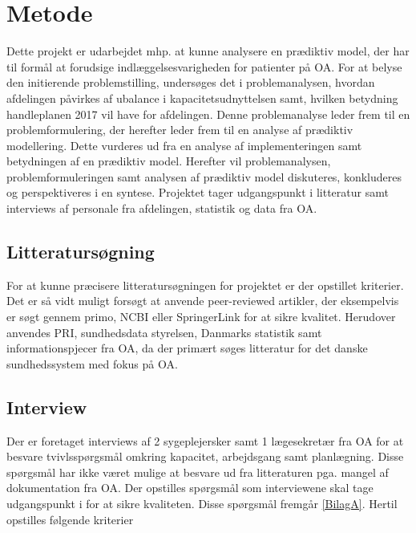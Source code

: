 

\section{Metode}
Dette projekt er udarbejdet mhp. at kunne analysere en prædiktiv model, der har til formål at forudsige indlæggelsesvarigheden for patienter på OA. For at belyse den initierende problemstilling, undersøges det i problemanalysen, hvordan afdelingen påvirkes af ubalance i kapacitetsudnyttelsen samt, hvilken betydning handleplanen 2017 vil have for afdelingen. Denne problemanalyse leder frem til en problemformulering, der herefter leder frem til en analyse af prædiktiv modellering. Dette vurderes ud fra en analyse af implementeringen samt betydningen af en prædiktiv model. Herefter vil problemanalysen, problemformuleringen samt analysen af prædiktiv model diskuteres, konkluderes og perspektiveres i en syntese. Projektet tager udgangspunkt i litteratur samt interviews af personale fra afdelingen, statistik og data fra OA. 


\subsection{Litteratursøgning}
For at kunne præcisere litteratursøgningen for projektet er der opstillet kriterier. Det er så vidt muligt forsøgt at anvende peer-reviewed artikler, der eksempelvis er søgt gennem primo, NCBI eller SpringerLink for at sikre kvalitet. Herudover anvendes PRI, sundhedsdata styrelsen, Danmarks statistik samt informationspjecer fra OA, da der primært søges litteratur for det danske sundhedssystem med fokus på OA. 


\subsection{Interview}
Der er foretaget interviews af 2 sygeplejersker samt 1 lægesekretær fra OA for at besvare tvivlsspørgsmål omkring kapacitet, arbejdsgang samt planlægning. Disse spørgsmål har ikke været mulige at besvare ud fra litteraturen pga. mangel af dokumentation fra OA. Der opstilles spørgsmål som interviewene skal tage udgangspunkt i for at sikre kvaliteten. Disse spørgsmål fremgår \ref{BilagA}. Hertil opstilles følgende kriterier 




